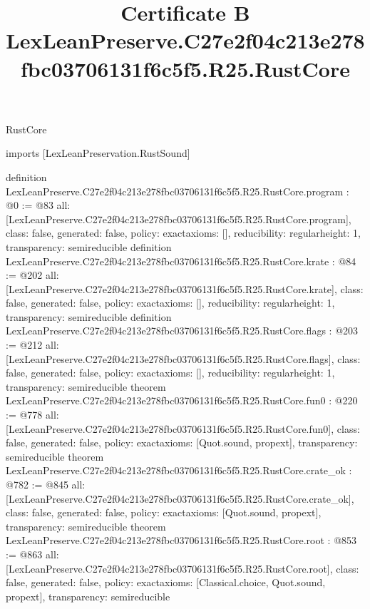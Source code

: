 \begin{lexlean}{RustCore}
\title{Certificate B LexLeanPreserve.C27e2f04c213e278fbc03706131f6c5f5.R25.RustCore}
\begin{coremodule}
imports [LexLeanPreservation.RustSound]

definition LexLeanPreserve.C27e2f04c213e278fbc03706131f6c5f5.R25.RustCore.program : @0 := @83 {
  all: [LexLeanPreserve.C27e2f04c213e278fbc03706131f6c5f5.R25.RustCore.program],
  class: false,
  generated: false,
  policy: exact{axioms: []},
  reducibility: regular{height: 1},
  transparency: semireducible
}
definition LexLeanPreserve.C27e2f04c213e278fbc03706131f6c5f5.R25.RustCore.krate : @84 := @202 {
  all: [LexLeanPreserve.C27e2f04c213e278fbc03706131f6c5f5.R25.RustCore.krate],
  class: false,
  generated: false,
  policy: exact{axioms: []},
  reducibility: regular{height: 1},
  transparency: semireducible
}
definition LexLeanPreserve.C27e2f04c213e278fbc03706131f6c5f5.R25.RustCore.flags : @203 := @212 {
  all: [LexLeanPreserve.C27e2f04c213e278fbc03706131f6c5f5.R25.RustCore.flags],
  class: false,
  generated: false,
  policy: exact{axioms: []},
  reducibility: regular{height: 1},
  transparency: semireducible
}
theorem LexLeanPreserve.C27e2f04c213e278fbc03706131f6c5f5.R25.RustCore.fun0 : @220 := @778 {
  all: [LexLeanPreserve.C27e2f04c213e278fbc03706131f6c5f5.R25.RustCore.fun0],
  class: false,
  generated: false,
  policy: exact{axioms: [Quot.sound, propext]},
  transparency: semireducible
}
theorem LexLeanPreserve.C27e2f04c213e278fbc03706131f6c5f5.R25.RustCore.crate_ok : @782 := @845 {
  all: [LexLeanPreserve.C27e2f04c213e278fbc03706131f6c5f5.R25.RustCore.crate_ok],
  class: false,
  generated: false,
  policy: exact{axioms: [Quot.sound, propext]},
  transparency: semireducible
}
theorem LexLeanPreserve.C27e2f04c213e278fbc03706131f6c5f5.R25.RustCore.root : @853 := @863 {
  all: [LexLeanPreserve.C27e2f04c213e278fbc03706131f6c5f5.R25.RustCore.root],
  class: false,
  generated: false,
  policy: exact{axioms: [Classical.choice, Quot.sound, propext]},
  transparency: semireducible
}


\end{coremodule}
\end{lexlean}
